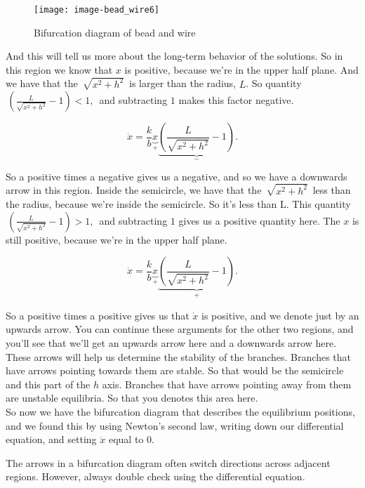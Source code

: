 \begin{wrapfigure}{r}{4cm}
  \texttt{[image: image-bead\_wire6]}
  \caption{Bifurcation diagram of bead and wire}
\end{wrapfigure}

And this will tell us more about the long-term behavior of the solutions.
So in this region we know that $x$ is positive, because we're in the upper half plane.
And we have that the $\, \sqrt {x^2+h^2} \,$ is larger than the radius, $L$.
So quantity $\, \displaystyle (\frac{L}{\sqrt {x^2+h^2}} - 1) < 1 , \,$ and subtracting $1$
makes this factor negative.

\begin{equation*}
  \dot x = \frac{k}{b} \underbrace{x}_{+}
  \underbrace{\left(\frac{L}{\sqrt {x^2+h^2}} - 1 \right)}_{-}.
\end{equation*}

So a positive times a negative gives us a negative,
and so we have a downwards arrow in this region.
Inside the semicircle, we have that the $\, \sqrt {x^2+h^2} \,$ less than the radius,
because we're inside the semicircle.
So it's less than L. This quantity $\, \displaystyle (\frac{L}{\sqrt {x^2+h^2}} - 1) > 1 , \,$
and subtracting $1$ gives us a positive quantity here.
The $x$ is still positive, because we're in the upper half plane.

\begin{equation*}
  \dot x = \frac{k}{b} \underbrace{x}_{+}
  \underbrace{\left(\frac{L}{\sqrt {x^2+h^2}} - 1 \right)}_{+}.
\end{equation*}

So a positive times a positive gives us that $\dot x$ is positive, and we denote just
by an upwards arrow.
You can continue these arguments for the other two regions,
and you'll see that we'll get an upwards arrow here and a downwards arrow here.
These arrows will help us determine the stability of the branches.
Branches that have arrows pointing towards them are stable.
So that would be the semicircle and this part of the $h$ axis.
Branches that have arrows pointing away from them
are unstable equilibria. So that you denotes this area here. \\

So now we have the bifurcation diagram that describes the equilibrium positions,
and we found this by using Newton's second law, writing down our differential equation,
and setting $\dot x$ equal to 0.

\begin{remark}
  The arrows in a bifurcation diagram often switch directions across adjacent regions.
  However, always double check using the differential equation.
\end{remark}

